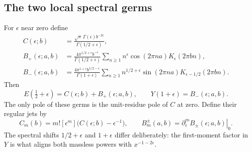 \subsection{The two local spectral germs}
For $\epsilon$ near zero define
\begin{align}
C(\epsilon;b)&=\frac{\sqrt\pi\,\Gamma(\epsilon)b^{-2\epsilon}}
                         {\Gamma(1/2+\epsilon)},\label{qspec:eq:Cgerm}\\
B_+(\epsilon;a,b)&=
\frac{4\pi^{1/2+\epsilon}b^{-\epsilon}}{\Gamma(1/2+\epsilon)}
\sum_{n\ge1}n^\epsilon\cos(2\pi na)K_\epsilon(2\pi bn),\label{qspec:eq:Bplusgerm}\\
B_-(\epsilon;a,b)&=
\frac{4\pi^{1+\epsilon}b^{1/2-\epsilon}}{\Gamma(1+\epsilon)}
\sum_{n\ge1}n^{1/2+\epsilon}\sin(2\pi na)
 K_{\epsilon-1/2}(2\pi bn).\label{qspec:eq:Bminusgerm}
\end{align}
Then
\begin{equation}\label{qspec:eq:germ-identities}
E(\tfrac12+\epsilon)=C(\epsilon;b)+B_+(\epsilon;a,b),
\qquad Y(1+\epsilon)=B_-(\epsilon;a,b).
\end{equation}
The only pole of these germs is the unit-residue pole of $C$ at zero.
Define their regular jets by
\begin{equation}\label{qspec:eq:jet-definitions}
C_m(b)=m![\epsilon^m]\bigl(C(\epsilon;b)-\epsilon^{-1}\bigr),
\qquad B_m^\pm(a,b)=\left.\partial_\epsilon^m B_\pm(\epsilon;a,b)\right|_{0}.
\end{equation}
The spectral shifts $1/2+\epsilon$ and $1+\epsilon$ differ deliberately:
the first-moment factor in $Y$ is what aligns both massless powers with
$x^{-1-2\epsilon}$.
